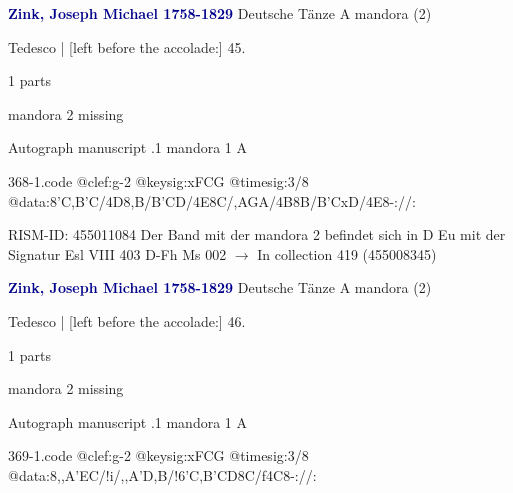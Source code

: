 \documentclass[twocolumn]{book}
\begin{document}
\newline \par \vspace{7pt} \textcolor{darkblue}{\textbf{Zink, Joseph Michael  1758-1829}}
\newline Deutsche Tänze  A  
\newline mandora (2)
\newline \begin{itshape}[f.25v, at left:] Tedesco | [left before the accolade:] 45.\end{itshape} 
\newline \textcolor{darkblue}{}  1 parts  
\newline \begin{small} mandora 2 missing\end{small} 
\newline Autograph manuscript
.1  mandora 1  A  
\begin{filecontents*}{368-1.code}
@clef:g-2
@keysig:xFCG
@timesig:3/8
@data:8'C,B'C/4D8,B/B'CD/4E8C/,A{GA}/4B8B/B'CxD/4E8-://:
\end{filecontents*}
\newline
%

\newline RISM-ID: 455011084
\newline Der Band mit der mandora 2 befindet sich in D Eu mit der Signatur Esl VIII 403
\newline D-Fh  Ms 002
\newline $\rightarrow$ In collection 419 (455008345)

\newline \par \vspace{7pt} \textcolor{darkblue}{\textbf{Zink, Joseph Michael  1758-1829}}
\newline Deutsche Tänze  A  
\newline mandora (2)
\newline \begin{itshape}[f.25v, at left:] Tedesco | [left before the accolade:] 46.\end{itshape} 
\newline \textcolor{darkblue}{}  1 parts  
\newline \begin{small} mandora 2 missing\end{small} 
\newline Autograph manuscript
.1  mandora 1  A  
\begin{filecontents*}{369-1.code}
@clef:g-2
@keysig:xFCG
@timesig:3/8
@data:8,,A'EC/!i/,,A'D,B/!{6'C,B'CD}8C/f4C8-://:
\end{filecontents*}
\newline
%
\end{document}
